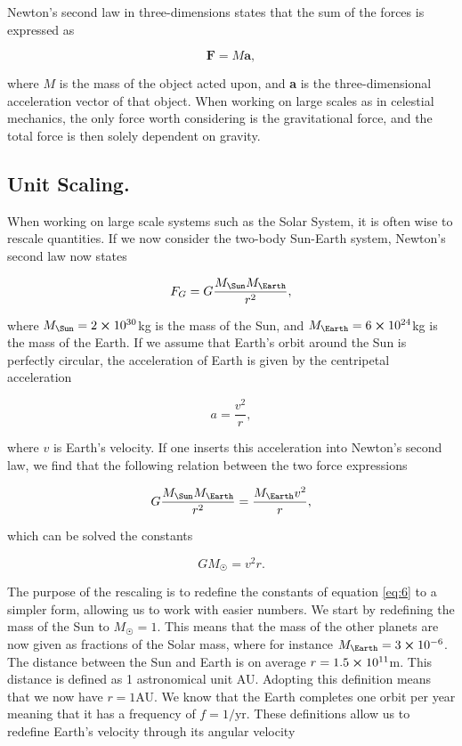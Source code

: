 \documentclass[a4paper, 10pt, reqno]{amsart}
\begin{document}
Newton's second law in three-dimensions states that the sum of the forces is expressed as

\begin{equation}\label{eq:3}
    \mathbf{F} = M \mathbf{a},
\end{equation}

\noindent where $M$ is the mass of the object acted upon, and \textbf{a} is the three-dimensional acceleration vector of that object. When working on large scales as in celestial mechanics, the only force worth considering is the gravitational force, and the total force is then solely dependent on gravity.

\subsection{Unit Scaling.}
When working on large scale systems such as the Solar System, it is often wise to rescale quantities. If we now consider the two-body Sun-Earth system, Newton's second law now states

\begin{equation}\label{eq:4}
    F_G = G \frac{M_\Sun M_\Earth}{r^2},
\end{equation}

\noindent where $M_\Sun = 2 \cross 10^{30}$kg is the mass of the Sun, and $M_\Earth = 6 \cross 10^{24}$kg is the mass of the Earth. If we assume that Earth's orbit around the Sun is perfectly circular, the acceleration of Earth is given by the centripetal acceleration

\begin{equation}\label{eq:5}
    a = \frac{v^2}{r},
\end{equation}

\noindent where $v$ is Earth's velocity. If one inserts this acceleration into Newton's second law, we find that the following relation between the two force expressions 

\begin{equation*}
    G \frac{M_\Sun M_\Earth}{r^2} = \frac{M_\Earth v^2}{r},
\end{equation*}

\noindent which can be solved the constants

\begin{equation}\label{eq:6}
    GM_\Sun = v^2r.
\end{equation}

The purpose of the rescaling is to redefine the constants of equation \eqref{eq:6} to a simpler form, allowing us to work with easier numbers. We start by redefining the mass of the Sun to $M_\Sun = 1$. This means that the mass of the other planets are now given as fractions of the Solar mass, where for instance $M_\Earth = 3 \cross 10^{-6}$. The distance between the Sun and Earth is on average $r = 1.5 \cross 10^{11}$m. This distance is defined as 1 astronomical unit AU. Adopting this definition means that we now have $r = 1$AU. We know that the Earth completes one orbit per year meaning that it has a frequency of $f = 1/\text{yr}$. These definitions allow us to redefine Earth's velocity through its angular velocity
\end{document}
